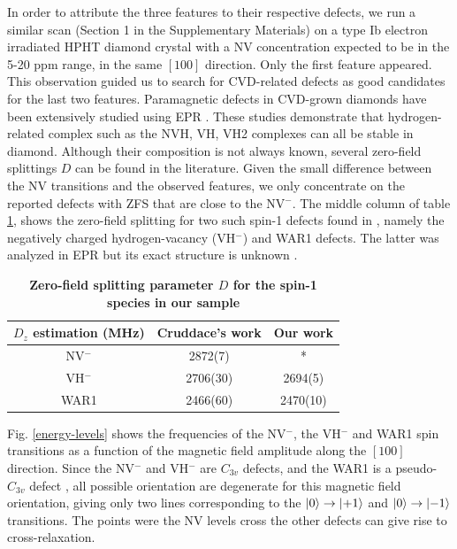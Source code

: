 \documentclass[9pt,twocolumn,twoside]{revtex4-1}
\begin{document}
In order to attribute the three features to their respective defects, we run a similar scan (Section 1 in the Supplementary Materials) on a type Ib electron irradiated HPHT diamond crystal with a NV concentration expected to be in the 5-20 ppm range, in the same $[100]$ direction. Only the first feature appeared. 
This observation guided us to search for CVD-related defects as good candidates for the last two features. Paramagnetic defects in CVD-grown diamonds have been extensively studied using EPR  \citep{Ashfold}. These studies demonstrate that hydrogen-related complex such as the NVH, VH, VH2 complexes can all be stable in diamond. Although their composition is not always known, several zero-field splittings $D$ can be found in the literature.
Given the small difference between the NV transitions and the observed features, we only concentrate on the reported defects with ZFS that are close to the NV$^-$.
The middle column of table \ref{table}, shows the zero-field splitting for two such spin-1 defects found in \citep{cruddace2007magnetic}, namely the negatively charged hydrogen-vacancy (VH$^-$) and WAR1 defects. The latter was analyzed in EPR but its exact structure is unknown \citep{cruddace2007magnetic}.
\begin{table}[htbp]
\centering
\caption{\bf Zero-field splitting parameter $D$ for the spin-1 species in our sample}
\begin{tabular}{ccc}
\hline
$D_z$ estimation (MHz) & Cruddace's work\citep{cruddace2007magnetic} & Our work \\
\hline
NV$^-$ & 2872(7) & * \\
VH$^-$ & 2706(30) & 2694(5)  \\
WAR1 & 2466(60) & 2470(10) \\
\hline
\end{tabular}
  \label{table}
\end{table}
Fig. \ref{energy-levels} shows the frequencies of the NV$^-$, the VH$^-$ and WAR1 spin transitions as a function of the magnetic field amplitude along the $[100]$ direction. Since the NV$^-$ and VH$^-$ are $C_{3v}$ defects, and the WAR1 is a pseudo-$C_{3v}$ defect \citep{cruddace2007magnetic}, all possible orientation are degenerate for this magnetic field orientation, giving only two lines corresponding to the $\ket{0} \to \ket{+1}$ and $\ket{0} \to \ket{-1}$ transitions. The points were the NV levels cross the other defects can give rise to cross-relaxation.
\end{document}

